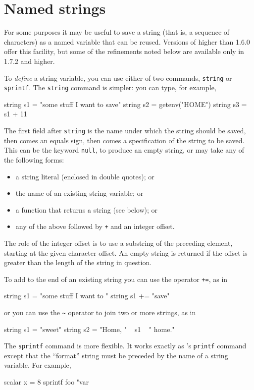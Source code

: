 \section{Named strings}
\label{sec:named-strings}

For some purposes it may be useful to save a string (that is, a
sequence of characters) as a named variable that can be reused.
Versions of  higher than 1.6.0 offer this facility, but
some of the refinements noted below are available only in 
1.7.2 and higher.

To \textit{define} a string variable, you can use either of two
commands, \texttt{string} or \texttt{sprintf}.  The \texttt{string}
command is simpler: you can type, for example,
%
\begin{code}
string s1 = "some stuff I want to save"
string s2 = getenv("HOME")
string s3 = s1 + 11
\end{code}
%
The first field after \texttt{string} is the name under which the
string should be saved, then comes an equals sign, then comes a
specification of the string to be saved. This can be the keyword
\texttt{null}, to produce an empty string, or may take any of the 
following forms:

\begin{itemize}
\item a string literal (enclosed in double quotes); or
\item the name of an existing string variable; or
\item a function that returns a string (see below); or
\item any of the above followed by \texttt{+} and an integer offset.
\end{itemize}

The role of the integer offset is to use a substring of the preceding
element, starting at the given character offset.  An empty string is
returned if the offset is greater than the length of the string in
question.

To add to the end of an existing string you can use the operator
\texttt{+=}, as in
%
\begin{code}
string s1 = "some stuff I want to "
string s1 += "save"
\end{code}
or you can use the \verb|~| operator to join two or more strings, as
in
\begin{code}
string s1 = "sweet"
string s2 = "Home, " ~ s1 ~ " home."
\end{code}

The \texttt{sprintf} command is more flexible.  It works exactly as
's \texttt{printf} command except that the ``format''
string must be preceded by the name of a string variable.  For
example,
%
\begin{code}
scalar x = 8
sprintf foo "var%
\end{code}

